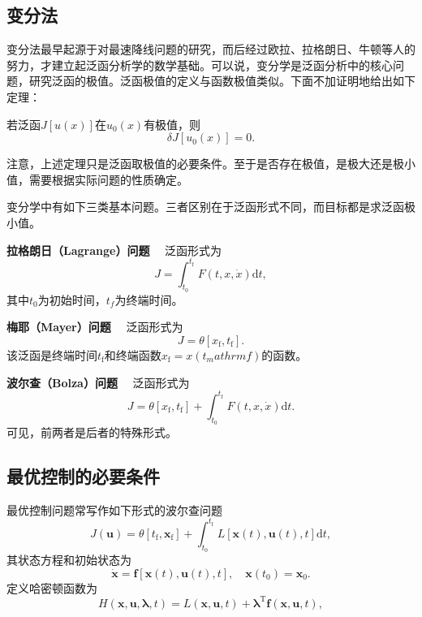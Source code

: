 \subsection{变分法}
变分法最早起源于对最速降线\cite{brachistochrone2017}问题的研究，而后经过欧拉、拉格朗日、牛顿等人的努力，才建立起泛函分析学的数学基础\cite{calculus2017}。可以说，变分学是泛函分析中的核心问题，研究泛函的极值。泛函极值的定义与函数极值类似。下面不加证明地给出如下定理：
\begin{theorem}
若泛函$J[u(x)]$在$u_0(x)$有极值，则
\begin{equation}
\delta J[u_0(x)]=0.
\end{equation}
\end{theorem}
注意，上述定理只是泛函取极值的必要条件。至于是否存在极值，是极大还是极小值，需要根据实际问题的性质确定。

变分学中有如下三类基本问题。三者区别在于泛函形式不同，而目标都是求泛函极小值。

\textbf{拉格朗日（Lagrange）问题} \ \ 泛函形式为
\begin{equation}
J = \int_{t_0}^{t_\mathrm{f}}F(t,x,\dot{x})\mathrm{d}t,
\end{equation}
其中$t_0$为初始时间，$t_f$为终端时间。

\textbf{梅耶（Mayer）问题} \ \ 泛函形式为
\begin{equation}
J=\theta[x_\mathrm{f},t_\mathrm{f}].
\end{equation}
该泛函是终端时间$t_\mathrm{f}$和终端函数$x_\mathrm{f}=x(t_mathrm{f})$的函数。

\textbf{波尔查（Bolza）问题} \ \ 泛函形式为
\begin{equation}
J=\theta[x_\mathrm{f},t_\mathrm{f}]+\int_{t_0}^{t_\mathrm{f}}F(t,x,\dot{x})\mathrm{d}t.
\end{equation}
可见，前两者是后者的特殊形式。

\subsection{最优控制的必要条件}
最优控制问题常写作如下形式的波尔查问题
\begin{equation}
J(\bm{u})=\theta[t_\mathrm{f},\bm{x}_\mathrm{f}]+\int_{t_0}^{t_\mathrm{f}}L[\bm{x}(t),\bm{u}(t),t]\mathrm{d}t,
\end{equation}
其状态方程和初始状态为
\begin{equation}
\dot{\bm{x}}=\bm{f}[\bm{x}(t),\bm{u}(t),t], \quad \bm{x}(t_0)=\bm{x}_0.
\end{equation}
定义{\heiti 哈密顿函数}为
\begin{equation}
H(\bm{x},\bm{u},\bm{\lambda},t)=L(\bm{x},\bm{u},t)+\bm{\lambda}^\mathrm{T}\bm{f}(\bm{x},\bm{u},t),
\end{equation}

